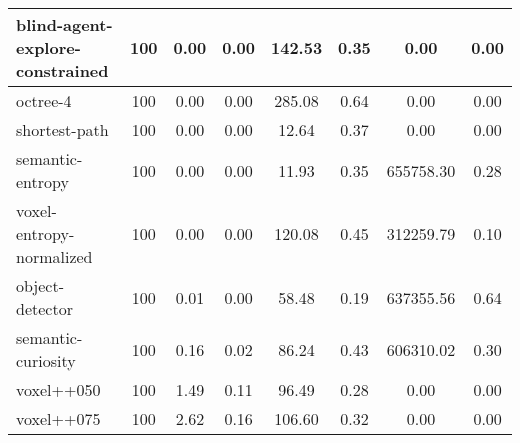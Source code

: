 \begin{sidewaystable}
\begin{longtable}{|l|c|c| c|c| c|c|c|}
        blind-agent-explore-constrained & 100 & {\cellcolor[HTML]{EBF2F0}} \color[HTML]{000000} 0.00 & {\cellcolor[HTML]{EBF2F0}} \color[HTML]{000000} 0.00 & {\cellcolor[HTML]{A0CEC5}} \color[HTML]{000000} 142.53 & 0.35 & 0.00 & 0.00 \\ \hline
        octree-4 & 100 & {\cellcolor[HTML]{EBF2F0}} \color[HTML]{000000} 0.00 & {\cellcolor[HTML]{EBF2F0}} \color[HTML]{000000} 0.00 & {\cellcolor[HTML]{55AA99}} \color[HTML]{F1F1F1} 285.08 & 0.64 & 0.00 & 0.00 \\ \hline
        shortest-path & 100 & {\cellcolor[HTML]{EBF2F0}} \color[HTML]{000000} 0.00 & {\cellcolor[HTML]{EBF2F0}} \color[HTML]{000000} 0.00 & {\cellcolor[HTML]{E5EFED}} \color[HTML]{000000} 12.64 & 0.37 & 0.00 & 0.00 \\ \hline
        semantic-entropy & 100 & {\cellcolor[HTML]{EBF2F0}} \color[HTML]{000000} 0.00 & {\cellcolor[HTML]{EBF2F0}} \color[HTML]{000000} 0.00 & {\cellcolor[HTML]{E5EFED}} \color[HTML]{000000} 11.93 & 0.35 & 655758.30 & 0.28 \\ \hline
        voxel-entropy-normalized & 100 & {\cellcolor[HTML]{EBF2F0}} \color[HTML]{000000} 0.00 & {\cellcolor[HTML]{EBF2F0}} \color[HTML]{000000} 0.00 & {\cellcolor[HTML]{ACD4CC}} \color[HTML]{000000} 120.08 & 0.45 & 312259.79 & 0.10 \\ \hline
        object-detector & 100 & {\cellcolor[HTML]{EBF2F0}} \color[HTML]{000000} 0.01 & {\cellcolor[HTML]{EBF2F0}} \color[HTML]{000000} 0.00 & {\cellcolor[HTML]{CCE3DF}} \color[HTML]{000000} 58.48 & 0.19 & 637355.56 & 0.64 \\ \hline
        semantic-curiosity & 100 & {\cellcolor[HTML]{EBF2F0}} \color[HTML]{000000} 0.16 & {\cellcolor[HTML]{EBF2F0}} \color[HTML]{000000} 0.02 & {\cellcolor[HTML]{BEDCD6}} \color[HTML]{000000} 86.24 & 0.43 & 606310.02 & 0.30 \\ \hline
        voxel++050 & 100 & {\cellcolor[HTML]{D5E8E4}} \color[HTML]{000000} 1.49 & {\cellcolor[HTML]{EBF2F0}} \color[HTML]{000000} 0.11 & {\cellcolor[HTML]{B8DAD3}} \color[HTML]{000000} 96.49 & 0.28 & 0.00 & 0.00 \\ \hline
        voxel++075 & 100 & {\cellcolor[HTML]{C3DFD9}} \color[HTML]{000000} 2.62 & {\cellcolor[HTML]{D9EAE6}} \color[HTML]{000000} 0.16 & {\cellcolor[HTML]{B3D7D0}} \color[HTML]{000000} 106.60 & 0.32 & 0.00 & 0.00 \\ \hline

\end{longtable}
\end{sidewaystable}
